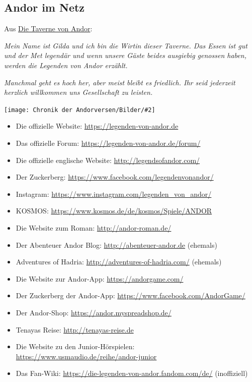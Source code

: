 \documentclass[10pt, a4paper, oneside]{book}
\newcommand{\refprodukt}[1]{\hyperref[Produkt: #1]{#1}}
\newcommand{\bildmitts}[2][height=0.32\textwidth,width=0.48\textwidth,keepaspectratio]{%
    \begin{center}
        \texttt{[image: Chronik der Andorversen/Bilder/\#2]}
    \end{center}
}
\begin{document}
\begin{multicols}{2}



\begin{chapterbox}
    \chapter{Andor im Netz}

    \begin{center}
        Aus \refprodukt{Die Taverne von Andor}:
    \end{center}

    \textit{Mein Name ist Gilda und ich bin die Wirtin dieser Taverne. Das Essen ist gut und der Met legendär und wenn unsere Gäste beides ausgiebig genossen haben, werden die Legenden von Andor erzählt.}

    \textit{Manchmal geht es hoch her, aber meist bleibt es friedlich. Ihr seid jederzeit herzlich willkommen uns Gesellschaft zu leisten.}

    \bildmitts[width=\textwidth]{Taverne von Andor.jpg}
\end{chapterbox}

\extramarks{}{} %

\end{multicols}


\begin{itemize}[topsep=0pt,itemsep=-1ex,partopsep=1ex,parsep=1ex]
    \item Die offizielle Website: \url{https://legenden-von-andor.de}
    \item Das offizielle Forum: \url{https://legenden-von-andor.de/forum/}
    \item Die offizielle englische Website: \url{http://legendsofandor.com/}
    \item Der Zuckerberg: \url{https://www.facebook.com/legendenvonandor/}
    \item Instagram: \url{https://www.instagram.com/legenden_von_andor/}
    \item KOSMOS: \url{https://www.kosmos.de/de/kosmos/Spiele/ANDOR}
    \item Die Website zum Roman: \url{http://andor-roman.de/}
    \item Der Abenteuer Andor Blog: \url{http://abenteuer-andor.de} (ehemals)
    \item Adventures of Hadria: \url{http://adventures-of-hadria.com/} (ehemals)
    \item Die Website zur Andor-App: \url{https://andorgame.com/}
    \item Der Zuckerberg der Andor-App: \url{https://www.facebook.com/AndorGame/}
    \item Der Andor-Shop: \url{https://andor.myspreadshop.de/}
    \item Tenayas Reise: \url{http://tenayas-reise.de}
    \item Die Website zu den Junior-Hörspielen: \url{https://www.usmaudio.de/reihe/andor-junior}
    \item Das Fan-Wiki: \url{https://die-legenden-von-andor.fandom.com/de/} (inoffiziell)
\end{itemize}
\end{document}
